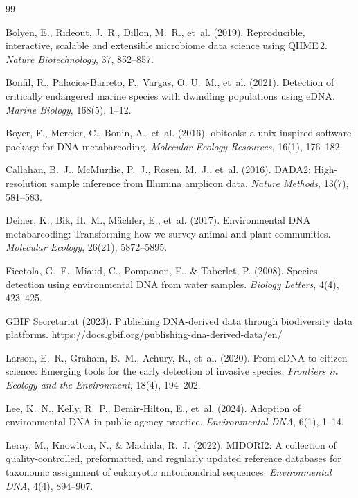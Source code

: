 \documentclass[11pt, a4paper]{article}
\begin{document}
\begin{thebibliography}{99}

Bolyen, E., Rideout, J.~R., Dillon, M.~R., et~al. (2019).
Reproducible, interactive, scalable and extensible microbiome data
science using QIIME\,2.
\textit{Nature Biotechnology}, 37, 852--857.

Bonfil, R., Palacios-Barreto, P., Vargas, O. U.~M., et~al. (2021).
Detection of critically endangered marine species with dwindling
populations using eDNA.
\textit{Marine Biology}, 168(5), 1--12.

Boyer, F., Mercier, C., Bonin, A., et~al. (2016).
obitools: a unix-inspired software package for DNA metabarcoding.
\textit{Molecular Ecology Resources}, 16(1), 176--182.

Callahan, B.~J., McMurdie, P.~J., Rosen, M.~J., et~al. (2016).
DADA2: High-resolution sample inference from Illumina amplicon data.
\textit{Nature Methods}, 13(7), 581--583.

Deiner, K., Bik, H.~M., M{\"a}chler, E., et~al. (2017).
Environmental DNA metabarcoding: Transforming how we survey animal
and plant communities.
\textit{Molecular Ecology}, 26(21), 5872--5895.

Ficetola, G.~F., Miaud, C., Pompanon, F., \& Taberlet, P. (2008).
Species detection using environmental DNA from water samples.
\textit{Biology Letters}, 4(4), 423--425.

GBIF Secretariat (2023).
Publishing DNA-derived data through biodiversity data platforms.
\url{https://docs.gbif.org/publishing-dna-derived-data/en/}

Larson, E.~R., Graham, B.~M., Achury, R., et~al. (2020).
From eDNA to citizen science: Emerging tools for the early detection
of invasive species.
\textit{Frontiers in Ecology and the Environment}, 18(4), 194--202.

Lee, K.~N., Kelly, R.~P., Demir-Hilton, E., et~al. (2024).
Adoption of environmental DNA in public agency practice.
\textit{Environmental DNA}, 6(1), 1--14.

Leray, M., Knowlton, N., \& Machida, R.~J. (2022).
MIDORI2: A collection of quality-controlled, preformatted, and
regularly updated reference databases for taxonomic assignment of
eukaryotic mitochondrial sequences.
\textit{Environmental DNA}, 4(4), 894--907.


\end{thebibliography}
\end{document}

